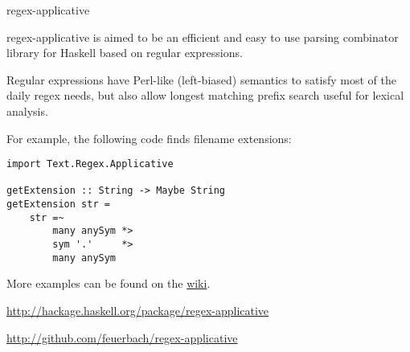 \begin{hcarentry}[new]{regex-applicative}
\makeheader

regex-applicative is aimed to be an efficient and easy to use parsing combinator library for Haskell based on regular expressions.

Regular expressions have Perl-like (left-biased) semantics to satisfy most of
the daily regex needs, but also allow longest matching prefix search
useful for
lexical analysis.

For example, the following code finds filename extensions:

\begin{verbatim}
import Text.Regex.Applicative

getExtension :: String -> Maybe String
getExtension str =
    str =~
        many anySym *>
        sym '.'     *>
        many anySym
\end{verbatim}

\noindent
More examples can be found on the
\href{https://github.com/feuerbach/regex-applicative/wiki/Examples}
{wiki}.

\FurtherReading
\begin{compactitem}
  \item \url{http://hackage.haskell.org/package/regex-applicative}
  \item \url{http://github.com/feuerbach/regex-applicative}
\end{compactitem}
\end{hcarentry}
